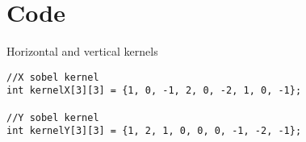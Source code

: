 \chapter{Code}
    \begin{listing}[H]
    	\caption{Horizontal and vertical kernels}
    	\label{listing:kernels}
    	\begin{verbatim}
//X sobel kernel
int kernelX[3][3] = {1, 0, -1, 2, 0, -2, 1, 0, -1};

//Y sobel kernel
int kernelY[3][3] = {1, 2, 1, 0, 0, 0, -1, -2, -1};
    	\end{verbatim}
    \end{listing}